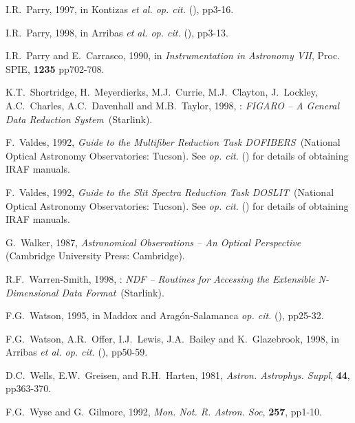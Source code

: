 \documentclass[twoside,11pt]{starlink}
\begin{document}
\begin{thebibliography}{99}
   I.R.~Parry, 1997, in Kontizas \textit{et al. op. cit.}\/
   (\cite{KONTIZAS97}), pp3-16.

   I.R.~Parry, 1998, in Arribas \textit{et al. op. cit.}\/
   (\cite{ARRIBAS98}), pp3-13.

   I.R.~Parry and E.~Carrasco, 1990, in \textit{Instrumentation in Astronomy VII}, Proc. SPIE, \textbf{1235} pp702-708.

   K.T.~Shortridge, H.~Meyerdierks, M.J.~Currie,
   M.J.~Clayton, J.~Lockley, A.C.~Charles, A.C.~Davenhall and M.B.~Taylor,
   1998, : \textit{FIGARO -- A General Data
   Reduction System}\, (Starlink).

   F.~Valdes, 1992, \textit{Guide to the Multifiber
   Reduction Task DOFIBERS}\, (National Optical Astronomy
   Observatories: Tucson).  See  \textit{op. cit.}\/
   (\cite{SG12}) for details of obtaining IRAF manuals.

   F.~Valdes, 1992, \textit{Guide to the Slit Spectra
   Reduction Task DOSLIT}\, (National Optical Astronomy Observatories:
   Tucson).  See  \textit{op. cit.}\/ (\cite{SG12}) for
   details of obtaining IRAF manuals.

   G.~Walker, 1987, \textit{Astronomical Observations
   -- An Optical Perspective}\, (Cambridge University Press: Cambridge).

   R.F.~Warren-Smith, 1998, :
   \textit{NDF -- Routines for Accessing the Extensible N-Dimensional Data
   Format}\, (Starlink).

   F.G.~Watson, 1995, in Maddox and Arag\'{o}n-Salamanca
   \textit{op. cit.}\/ (\cite{MADDOX95}), pp25-32.

   F.G.~Watson, A.R.~Offer, I.J.~Lewis, J.A.~Bailey
   and K.~Glazebrook, 1998, in Arribas \textit{et al. op. cit.}\/
   (\cite{ARRIBAS98}), pp50-59.

   D.C.~Wells, E.W.~Greisen, and R.H.~Harten, 1981,
   \textit{Astron. Astrophys. Suppl}, \textbf{44}, pp363-370.

   F.G.~Wyse and G.~Gilmore, 1992, \textit{Mon. Not. R.
   Astron. Soc}, \textbf{257}, pp1-10.

\end{thebibliography}

\typeout{  }
\typeout{*****************************************************}
\typeout{  }
\typeout{  }
\typeout{*****************************************************}
\typeout{  }
\end{document}
